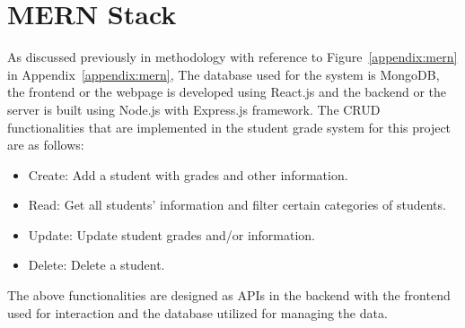 \section{MERN Stack}
As discussed previously in methodology with reference to Figure~\ref{appendix:mern} in Appendix~\ref{appendix:mern}, The database used for the system is MongoDB, the frontend or the webpage is developed using React.js and the backend or the server is built using Node.js with Express.js framework. The CRUD functionalities that are implemented in the student grade system for this project are as follows:

\begin{itemize}
\item Create: Add a student with grades and other information.
\item Read: Get all students' information and filter certain categories of students.
\item Update: Update student grades and/or information.
\item Delete: Delete a student.
\end{itemize}

The above functionalities are designed as APIs in the backend with the frontend used for interaction and the database utilized for managing the data.

